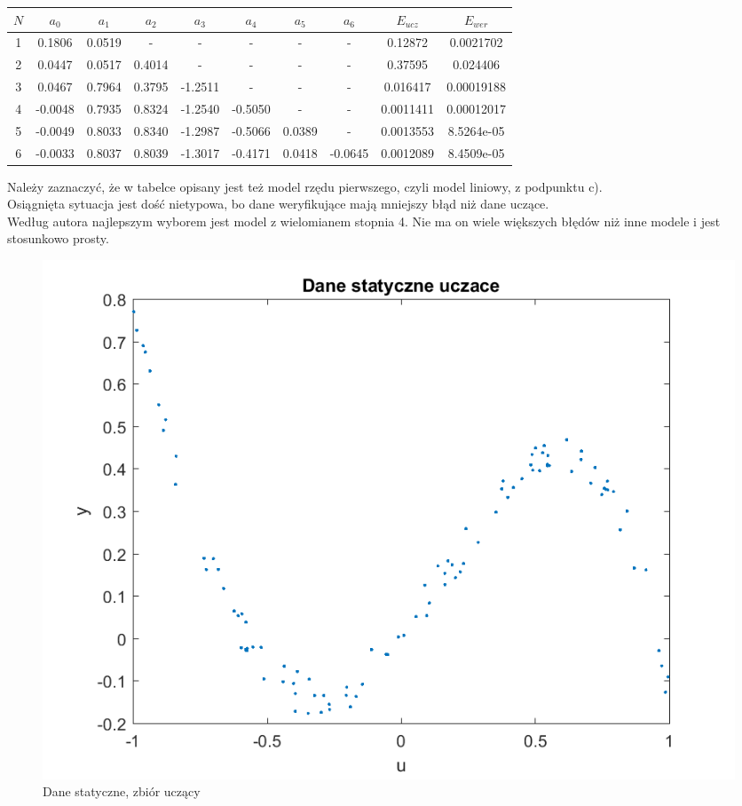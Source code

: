 \documentclass{article}
\begin{document}
\begin{tabular}{|c|c|c|c|c|c|c|c|c|c|}
\hline 
$N$ & $a_0$ & $a_1$ & $a_2$ & $a_3$ & $a_4$ & $a_5$ & $a_6$ & $E_{ucz}$ & $E_{wer}$ \\ 
\hline 
1 & 0.1806 & 0.0519 & - & - & - & - & - & 0.12872 & 0.0021702 \\ 
\hline 
2 & 0.0447 & 0.0517 & 0.4014 & - & - & - & - & 0.37595 & 0.024406 \\ 
\hline 
3 & 0.0467 &  0.7964&0.3795  &-1.2511  & - & - &-  &0.016417  &0.00019188  \\ 
\hline 
4 & -0.0048 & 0.7935 & 0.8324 & -1.2540  & -0.5050 & - & - & 0.0011411 & 0.00012017 \\ 
\hline 
5 &-0.0049  & 0.8033 & 0.8340 &   -1.2987&  -0.5066& 0.0389 & - & 0.0013553 & 8.5264e-05 \\ 
\hline 
6 & -0.0033 &  0.8037&  0.8039& -1.3017 &-0.4171  &0.0418  & -0.0645 & 0.0012089 & 8.4509e-05 \\ 
\hline 

\end{tabular} 
Należy zaznaczyć, że w tabelce opisany jest też model rzędu pierwszego, czyli model liniowy, z podpunktu c).\\
Osiągnięta sytuacja jest dość nietypowa, bo dane weryfikujące mają mniejszy błąd niż dane uczące.\\
Według autora najlepszym wyborem jest model z wielomianem stopnia 4. Nie ma on wiele większych błędów niż inne modele i jest stosunkowo prosty.
\begin{figure}
\centering
\includegraphics[width=0.95\linewidth]{../dane_statyczne/dane_statyczne_uczace}
\caption{Dane statyczne, zbiór uczący}
\label{fig:danestatyczneuczace}
\end{figure}
\end{document}
